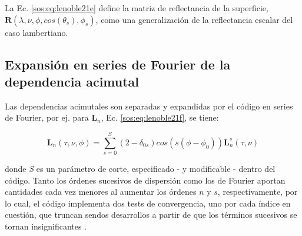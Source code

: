         La Ec. \ref{sos:eq:lenoble21e} define la matriz de reflectancia de la superficie, $\textbf{R}(\lambda,\nu,\phi,cos(\theta_{s}),\phi_{s})$, como una generalización de la reflectancia escalar del caso lambertiano.
        
    \subsection{Expansión en series de Fourier de la dependencia acimutal}
    \label{sos:s:fourierAcimutal}

        Las dependencias acimutales son separadas y expandidas por el código en series de  Fourier, por ej. para $\textbf{L}_{n}$, Ec. \ref{sos:eq:lenoble21f}, se tiene:
        
        \begin{equation}
        \textbf{L}_{n}(\tau,\nu,\phi)=\sum_{s=0}^{S}(2-\delta_{0s})cos(s(\phi-\phi_{0}))\textbf{L}_{n}^{s}
        (\tau,\nu)
        \label{sos:eq:SOS_FOURIER}
        \end{equation}
        
        \noindent donde \textit{S} es un parámetro de corte, especificado - y modificable - dentro del código. Tanto los órdenes sucesivos de dispersión como los de Fourier aportan cantidades cada vez menores al aumentar los órdenes $n$ y $s$,  respectivamente, por lo cual, el código implementa dos tests de convergencia, uno por cada índice en cuestión, que truncan sendos desarrollos a partir de que los términos sucesivos se tornan insignificantes \cite{lafrance2002}.